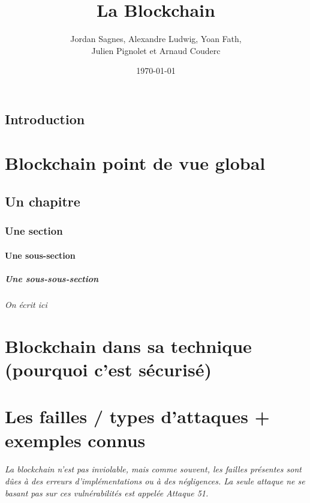 \documentclass[12pt, a4paper, oneside]{book}
\title{La Blockchain}
\author{ Jordan Sagnes, Alexandre Ludwig, Yoan Fath, \\ Julien Pignolet et Arnaud Couderc}
\date{\today}
\begin{document}
 
\maketitle
 
    \frontmatter
    \chapter{Introduction}
 
    \mainmatter
 
    \part{Blockchain point de vue global}
    \chapter{Un chapitre}
    \section{Une section}
    \subsection{Une sous-section}
    \subsubsection{Une sous-sous-section}
    \paragraph{On écrit ici}

    \part{Blockchain dans sa technique (pourquoi c'est sécurisé)}

    \part{Les failles / types d'attaques + exemples connus}
    \paragraph{La blockchain n'est pas inviolable, mais comme souvent, les failles présentes sont dûes à des erreurs d'implémentations ou à des négligences. La seule attaque ne se basant pas sur ces vulnérabilités est appelée \emph{Attaque 51}.}
\end{document}
